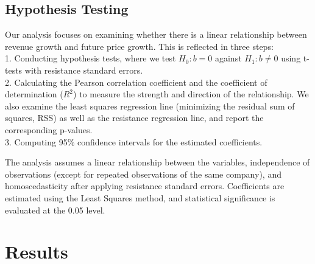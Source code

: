 \documentclass[11pt]{article}
\begin{document}


\subsection{Hypothesis Testing}

Our analysis focuses on examining whether there is a linear relationship between revenue growth and future price growth. This is reflected in three steps:  
\\ 1. Conducting hypothesis tests, where we test \( H_0: b = 0 \) against \( H_1: b \neq 0 \) using t-tests with resistance standard errors.
\\ 2. Calculating the Pearson correlation coefficient and the coefficient of determination (\(R^2\)) to measure the strength and direction of the relationship. We also examine the least squares regression line (minimizing the residual sum of squares, RSS) as well as the resistance regression line, and report the corresponding p-values.
\\ 3. Computing 95\% confidence intervals for the estimated coefficients.

The analysis assumes a linear relationship between the variables, independence of observations (except for repeated observations of the same company), and homoscedasticity after applying resistance standard errors. Coefficients are estimated using the Least Squares method, and statistical significance is evaluated at the 0.05 level.


\section{Results}
\end{document}
